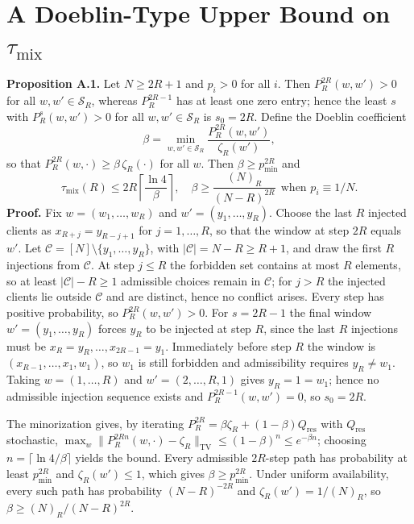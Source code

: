 \documentclass[twoside,11pt]{article}
\begin{document}

\appendix
\section{\texorpdfstring{A Doeblin-Type Upper Bound on $\tau_{\mathrm{mix}}$}{A Doeblin-Type Upper Bound on tau mix}}
\textbf{Proposition A.1.} Let $N\geq2R+1$ and $p_i>0$ for all $i$. Then $P_R^{2R}(w,w')>0$ for all $w,w'\in\mathcal{S}_R$, whereas $P_R^{2R-1}$ has at least one zero entry; hence the least $s$ with $P_R^{s}(w,w')>0$ for all $w,w'\in\mathcal{S}_R$ is $s_0=2R$. Define the Doeblin coefficient
\begin{equation}\label{eq:e47}
\beta=\min_{w,w'\in\mathcal{S}_R}\dfrac{P_R^{2R}(w,w')}{\zeta_R(w')},
\end{equation}
so that $P_R^{2R}(w,\cdot)\geq\beta\,\zeta_R(\cdot)$ for all $w$.
Then $\beta\geq p_{\min}^{2R}$ and
\begin{equation}\label{eq:e48}
\tau_{\mathrm{mix}}(R)\leq2R\left\lceil\dfrac{\ln4}{\beta}\right\rceil,\quad \beta\geq\dfrac{(N)_R}{(N-R)^{2R}}\ \ \text{when } p_i\equiv1/N.
\end{equation}
\textbf{Proof.} Fix $w=(w_1,\dots,w_R)$ and $w'=(y_1,\dots,y_R)$. Choose the last $R$ injected clients as $x_{R+j}=y_{R-j+1}$ for $j=1,\dots,R$, so that the window at step $2R$ equals $w'$. Let $\mathcal{C}=[N]\setminus\{y_1,\dots,y_R\}$, with $|\mathcal{C}|=N-R\geq R+1$, and draw the first $R$ injections from $\mathcal{C}$. At step $j\leq R$ the forbidden set contains at most $R$ elements, so at least $|\mathcal{C}|-R\geq1$ admissible choices remain in $\mathcal{C}$; for $j>R$ the injected clients lie outside $\mathcal{C}$ and are distinct, hence no conflict arises. Every step has positive probability, so $P_R^{2R}(w,w')>0$. For $s=2R-1$ the final window $w'=(y_1,\dots,y_R)$ forces $y_R$ to be injected at step $R$, since the last $R$ injections must be $x_{R}=y_R,\dots,x_{2R-1}=y_1$. Immediately before step $R$ the window is $(x_{R-1},\dots,x_1,w_1)$, so $w_1$ is still forbidden and admissibility requires $y_R\neq w_1$. Taking $w=(1,\dots,R)$ and $w'=(2,\dots,R,1)$ gives $y_R=1=w_1$; hence no admissible injection sequence exists and $P_R^{2R-1}(w,w')=0$, so $s_0=2R$.

The minorization \citep{ref24} gives, by iterating $P_R^{2R}=\beta\zeta_R+(1-\beta)Q_{\mathrm{res}}$ with $Q_{\mathrm{res}}$ stochastic, $\max_w\|P_R^{2Rn}(w,\cdot)-\zeta_R\|_{\mathrm{TV}}\leq(1-\beta)^{n}\leq e^{-\beta n}$; choosing $n=\lceil\ln4/\beta\rceil$ yields the bound. Every admissible $2R$-step path has probability at least $p_{\min}^{2R}$ and $\zeta_R(w')\leq1$, which gives $\beta\geq p_{\min}^{2R}$. Under uniform availability, every such path has probability $(N-R)^{-2R}$ and $\zeta_R(w')=1/(N)_R$, so $\beta\geq(N)_R/(N-R)^{2R}$.
\end{document}
